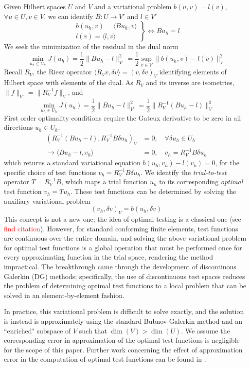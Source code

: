 \documentclass[11pt,onecolumn]{scrartcl}
\begin{document}
Given Hilbert spaces $U$ and $V$ and a variational problem $b(u,v) = l(v)$, $\forall u\in U, v\in V$, we can identify $B:U\rightarrow V'$ and $l \in V'$ 
\[
\left.\begin{array}{c}
b(u_h,v) = \langle Bu_h,v\rangle  \\
l(v) = \langle l,v\rangle
\end{array}\right\}
\Longleftrightarrow Bu_h = l
\]
We seek the minimization of the residual in the dual norm
\[
\min_{u_h\in U_h} J(u_h) = \frac{1}{2}\|Bu_h-l\|_{V'}^2 = \frac{1}{2} \sup_{v\in V} \| b(u_h,v)-l(v)\|_{V}^2
\]
Recall $R_V$, the Riesz operator $\langle R_V v,\delta v\rangle = (v, \delta v)_V$ identifying elements of Hilbert space with elements of the dual.  As $R_V$ and its inverse are isometries, $\|f\|_{V'} = \|R_V^{-1} f\|_V$, and 
\[
\min_{u_h\in U_h} J(u_h) = \frac{1}{2}\|Bu_h-l\|_{V'}^2 =  \frac{1}{2}\|R_V^{-1}(Bu_h-l)\|_V^2
\]
First order optimality conditions require the Gateux derivative to be zero in all directions $u_h \in U_h$.  
\begin{align*}
\left(R_V^{-1}(Bu_h-l),R_V^{-1}B\delta u_h\right)_V &= 0, \quad \forall \delta u_h \in U_h \\
\rightarrow \langle Bu_h-l, v_h\rangle &= 0, \quad v_h = R_V^{-1}B\delta u_h
\end{align*}
which returns a standard variational equation $b(u_h,v_h) - l(v_h) = 0$, for the specific choice of test functions $v_h = R_V^{-1}B\delta u_h$.  We identify the \textit{trial-to-test} operator $T = R_V^{-1}B$, which maps a trial function $u_h$ to its corresponding \textit{optimal} test function $v_h = Tu_h$.  These test functions can be determined by solving the auxiliary variational problem
\[
\left(v_h,\delta v\right)_V = b(u_h,\delta v)
\]
This concept is not a new one; the idea of optimal testing is a classical one (see \textcolor{red}{find citation}).  However, for standard conforming finite elements, test functions are continuous over the entire domain, and solving the above variational problem for optimal test functions is a global operation that must be performed once for every approximating function in the trial space, rendering the method impractical. The breakthrough came through the development of discontinous Galerkin (DG) methods; specifically, the use of discontinuous test spaces reduces the problem of determining optimal test functions to a local problem that can be solved in an element-by-element fashion.  

In practice, this variational problem is difficult to solve exactly, and the solution is instead is approximately using the standard Bubnov-Galerkin method and an ``enriched" subspace of $V$ such that $\dim(V) > \dim(U)$. We assume the corresponding error in approximation of the optimal test functions is negligible for the scope of this paper.  Further work concerning the effect of approximation error in the computation of optimal test functions can be found in \cite{practicalDPG}.
\end{document}
